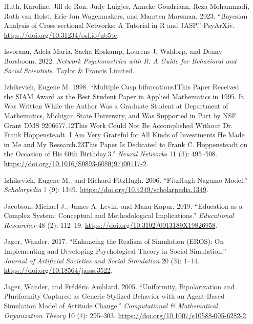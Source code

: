\documentclass[
  a4paper,
  DIV=11,
  numbers=noendperiod,
  oneside]{scrreprt}
\newlength{\cslhangindent}
\newenvironment{CSLReferences}[2] %
 {\begin{list}{}{%
  \setlength{\itemindent}{0pt}
  \setlength{\leftmargin}{0pt}
  \setlength{\parsep}{0pt}
  \ifodd #1
   \setlength{\leftmargin}{\cslhangindent}
   \setlength{\itemindent}{-1\cslhangindent}
  \fi
  \setlength{\itemsep}{#2\baselineskip}}}
 {\end{list}}
\begin{document}
\begin{CSLReferences}{1}{0}
Huth, Karoline, Jill de Ron, Judy Luigjes, Anneke Goudriaan, Reza
Mohammadi, Ruth van Holst, Eric-Jan Wagenmakers, and Maarten Marsman.
2023. {``Bayesian {Analysis} of {Cross-sectional Networks}: {A Tutorial}
in {R} and {JASP}.''} {PsyArXiv}.
\url{https://doi.org/10.31234/osf.io/ub5tc}.

Isvoranu, Adela-Maria, Sacha Epskamp, Lourens J. Waldorp, and Denny
Borsboom. 2022. \emph{Network {Psychometrics} with {R}: {A Guide} for
{Behavioral} and {Social Scientists}}. {Taylor \& Francis Limited}.

Izhikevich, Eugene M. 1998. {``Multiple Cusp {bifurcations1This} Paper
Received the {SIAM Award} as the Best Student Paper in Applied
Mathematics in 1995. {It} Was Written While the Author Was a Graduate
Student at Department of {Mathematics}, {Michigan State University}, and
Was Supported in Part by {NSF} Grant {DMS} 9206677.{12This} Work Could
Not Be Accomplished Without {Dr}. {Frank Hoppensteadt}. {I} Am Very
Grateful for All Kinds of Investments He Made in Me and My
Research.{23This} Paper Is Dedicated to {Frank C}. {Hoppensteadt} on the
Occasion of His 60th Birthday.3.''} \emph{Neural Networks} 11 (3):
495--508. \url{https://doi.org/10.1016/S0893-6080(97)00117-2}.

Izhikevich, Eugene M., and Richard FitzHugh. 2006. {``{FitzHugh-Nagumo}
Model.''} \emph{Scholarpedia} 1 (9): 1349.
\url{https://doi.org/10.4249/scholarpedia.1349}.

Jacobson, Michael J., James A. Levin, and Manu Kapur. 2019. {``Education
as a {Complex System}: {Conceptual} and {Methodological
Implications}.''} \emph{Educational Researcher} 48 (2): 112--19.
\url{https://doi.org/10.3102/0013189X19826958}.

Jager, Wander. 2017. {``Enhancing the {Realism} of {Simulation}
({EROS}): {On Implementing} and {Developing Psychological Theory} in
{Social Simulation}.''} \emph{Journal of Artificial Societies and Social
Simulation} 20 (3): 1--14. \url{https://doi.org/10.18564/jasss.3522}.

Jager, Wander, and Frédéric Amblard. 2005. {``Uniformity,
{Bipolarization} and {Pluriformity Captured} as {Generic Stylized
Behavior} with an {Agent-Based Simulation Model} of {Attitude
Change}.''} \emph{Computational \& Mathematical Organization Theory} 10
(4): 295--303. \url{https://doi.org/10.1007/s10588-005-6282-2}.


\end{CSLReferences}
\end{document}
